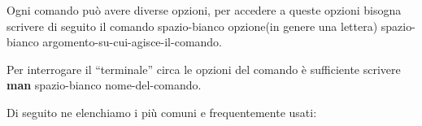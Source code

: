\documentclass[11pt,fleqn]{book} %
\begin{document}



Ogni comando può avere diverse opzioni, per accedere a queste opzioni bisogna scrivere di seguito il comando spazio-bianco opzione(in genere una lettera) spazio-bianco argomento-su-cui-agisce-il-comando.

Per interrogare il ``terminale'' circa le opzioni del comando è sufficiente scrivere \textbf{man} spazio-bianco nome-del-comando.

Di seguito ne elenchiamo i più comuni e frequentemente usati:
\end{document}
